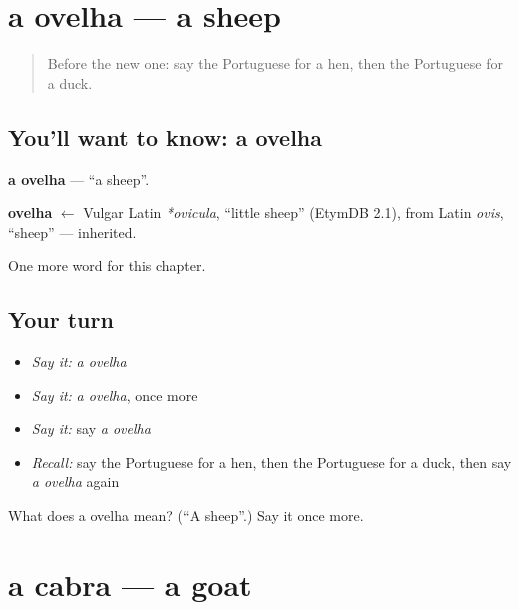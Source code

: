 \section[a ovelha]{a ovelha — a sheep}

\label{lesson:PT-C62-ovelha}



\begin{quote}
Before the new one: say the Portuguese for a hen, then the Portuguese for a duck.
\end{quote}

\subsection*{You'll want to know: a ovelha}
\textbf{a ovelha} — \textquotedblleft{}a sheep\textquotedblright{}.

\begin{cousinweb}
\textbf{ovelha} $\leftarrow$ Vulgar Latin \emph{*ovicula}, \textquotedblleft{}little sheep\textquotedblright{} (EtymDB 2.1), from Latin \emph{ovis}, \textquotedblleft{}sheep\textquotedblright{} — inherited.
\end{cousinweb}

\begin{grammarlens}[title={What you've built}]
One more word for this chapter.
\end{grammarlens}

\subsection*{Your turn}
\begin{itemize}
\raggedright
  \item \emph{Say it:} \emph{a ovelha}
  \item \emph{Say it:} \emph{a ovelha}, once more
  \item \emph{Say it:} say \emph{a ovelha}
  \item \emph{Recall:} say the Portuguese for a hen, then the Portuguese for a duck, then say \emph{a ovelha} again
\end{itemize}

\begin{tcolorbox}[breakable,colback=teal!4,colframe=teal!35!black,title={Before you move on}]
What does a ovelha mean? (\textquotedblleft{}A sheep\textquotedblright{}.) Say it once more.
\end{tcolorbox}
\section[a cabra]{a cabra — a goat}

